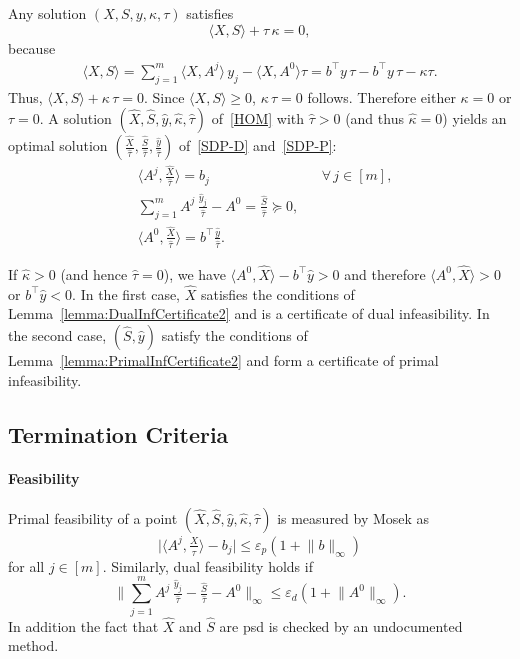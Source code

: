 \documentclass[10pt, a4paper]{article}
\newcommand{\abs}[1]{\lvert{#1}\rvert}
\newcommand{\norm}[1]{\lVert{#1}\rVert}
\newcommand{\skal}[2]{\langle{#1},{#2}\rangle}
\newcommand{\T}{^{\top}}
\begin{document}
Any solution $(X,S,y,\kappa,\tau)$ satisfies
\[
\skal{X}{S} + \tau\, \kappa = 0,
\]
because
\begin{align*}
  \skal{X}{S} = \sum_{j=1}^m \skal{X}{A^j}\, y_j - \skal{X}{A^0} \tau = b\T y\,\tau - b\T y\,\tau - \kappa \tau.
\end{align*}
Thus, $\skal{X}{S} + \kappa\, \tau = 0$. Since $\skal{X}{S} \geq 0$,
$\kappa \, \tau = 0$ follows. Therefore either $\kappa = 0$ or $\tau = 0$.
A solution $(\hat{X},\hat{S},\hat{y},\hat{\kappa},\hat{\tau})$
of~\eqref{HOM} with $\hat{\tau} > 0$ (and thus $\hat{\kappa} = 0$) yields
an optimal solution
$(\frac{\hat{X}}{\hat{\tau}}, \frac{\hat{S}}{\hat{\tau}},
\frac{\hat{y}}{\hat{\tau}})$ of~\eqref{SDP-D} and~\eqref{SDP-P}:
\begin{align*}
  & \skal{A^j}{\tfrac{\hat{X}}{\hat{\tau}}} = b_j && \forall \, j \in [m],\\
  & \sum_{j=1}^m A^j\, \tfrac{\hat{y}_j}{\hat{\tau}} -
    A^0 = \tfrac{\hat{S}}{\hat{\tau}} \succeq 0, \\
  & \skal{A^0}{\tfrac{\hat{X}}{\hat{\tau}}} = b\T \tfrac{\hat{y}}{\hat{\tau}}.
\end{align*}

If $\hat{\kappa} > 0$ (and hence $\hat{\tau} = 0$), we have
$\skal{A^0}{\hat{X}} - b\T \hat{y} > 0$ and therefore
$\skal{A^0}{\hat{X}} > 0$ or $b\T \hat{y} < 0$. In the first case,
$\hat{X}$ satisfies the conditions of Lemma~\ref{lemma:DualInfCertificate2}
and is a certificate of dual infeasibility. In the second case,
$(\hat{S},\hat{y})$ satisfy the conditions of
Lemma~\ref{lemma:PrimalInfCertificate2} and form a certificate of primal
infeasibility.


\subsection{Termination Criteria}

\paragraph{Feasibility}

Primal feasibility of a point
$(\hat{X},\hat{S},\hat{y},\hat{\kappa},\hat{\tau})$ is measured by Mosek as
\[
\abs{\skal{A^j}{\tfrac{\hat{X}}{\hat{\tau}}} - b_j}
\leq \varepsilon_p (1 + \norm{b}_\infty)
\]
for all $j \in [m]$. Similarly, dual feasibility holds if
\[
\Big\lVert\sum_{j=1}^m A^j\, \tfrac{\hat{y}_j}{\hat{\tau}} - \tfrac{\hat{S}}{\hat{\tau}} - A^0\Big\rVert_\infty
\leq \varepsilon_d (1 + \norm{A^0}_\infty).
\]
In addition the fact that $\hat{X}$ and $\hat{S}$ are psd is checked by an
undocumented method.
\end{document}
